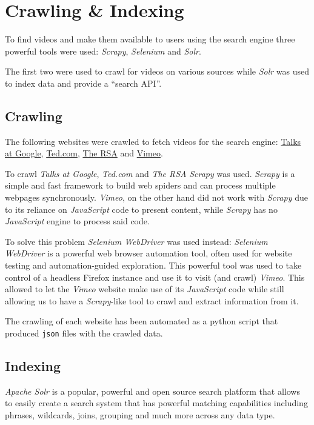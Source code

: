 \documentclass[12pt]{exam}
\newcommand{\n}[0]{
\hspace*{\fill}
}
\begin{document}
\newpage

\section{Crawling \& Indexing}

To find videos and make them available to users using the search engine
three powerful tools were used: \textit{Scrapy}, \textit{Selenium}
and \textit{Solr}.

The first two were used to crawl for videos on various sources while
\textit{Solr} was used to index data and provide a ``search API''.

\subsection{Crawling}

The following websites were crawled to fetch videos for the search
engine: \href{https://talksat.withgoogle.com}{Talks at Google},
\href{https://www.ted.com}{Ted.com}, \href{https://www.thersa.org}{The RSA} and
\href{https://vimeo.com}{Vimeo}. \n

To crawl \textit{Talks at Google}, \textit{Ted.com} and \textit{The RSA}
\textit{Scrapy} was used. \textit{Scrapy} is a simple and fast framework to
build web spiders and can process multiple webpages synchronously.
\textit{Vimeo}, on the other hand did not work with \textit{Scrapy} due to its
reliance on \textit{JavaScript} code to present content, while \textit{Scrapy}
has no \textit{JavaScript} engine to process said code. \n

To solve this problem \textit{Selenium WebDriver} was used instead:
\textit{Selenium WebDriver} is a powerful web browser automation tool,
often used for website testing and automation-guided exploration. This powerful
tool was used to take control of a headless Firefox instance and use it to
visit (and crawl) \textit{Vimeo}. This allowed to let the \textit{Vimeo}
website make use of its \textit{JavaScript} code while still allowing us to
have a \textit{Scrapy}-like tool to crawl and extract information from it.

The crawling of each website has been automated as a python script that
produced \texttt{json} files with the crawled data.

\subsection{Indexing}

\textit{Apache Solr} is a popular, powerful and open source search platform
that allows to easily create a search system that has powerful matching
capabilities including phrases, wildcards, joins, grouping and much more
across any data type. \n
\end{document}
